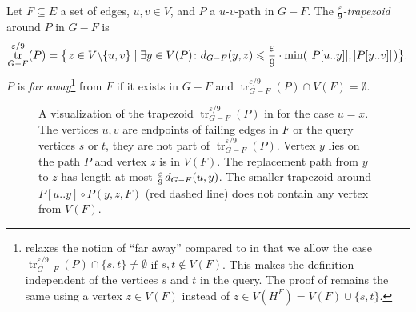 \documentclass{article}\usepackage[a4paper,margin=20mm]{geometry}
\DeclareMathOperator{\tr}{tr}
\newcommand*{\length}[1]{|#1|}
\newcommand*{\nwspace}{\hspace*{.1em}}
\renewcommand{\le}{\leqslant}
\newcommand{\eps}{\varepsilon}
\begin{document}
\begin{definition}[$\frac{\eps}{9}$-trapezoid]
\label{def:trapezoid}
  Let $F \subseteq E$ a set of edges, $u,v \in V$,
  and $P$ a $u$-$v$-path in $G-F$.
  The $\frac{\eps}{9}$\emph{-trapezoid} around $P$ in $G-F$ is
  \begin{equation*}
    \tr^{\eps/9}_{G-F}(P) = \big\lbrace\nwspace z \in V{\setminus}\{u,v\} \mid
      \exists y \in V(P) \colon d_{G-F}(y,z)
      \le \frac{\eps}{9}
        \cdot \min(\nwspace \length{P[u..y]}, \length{P[y..v]} \nwspace) \big\rbrace. 
  \end{equation*}
  \noindent
  $P$ is \emph{far away}\footnote{%
       relaxes the notion of ``far away'' compared to \cite{ChCoFiKa17}
      in that we allow the case
      $\tr^{\eps/9}_{G-F}(P) \cap \{s,t\} \neq \emptyset$
      if $s,t \notin V(F)$.
      This makes the definition independent of the vertices $s$ and $t$ in the query.
      The proof of  remains the same
      using a vertex $z \in V(F)$ instead of $z \in V(H^F) = V(F) \cup \{s,t\}$.
  }
  from $F$ if it exists in $G-F$
  and $\tr^{\eps/9}_{G-F}(P) \cap V(F) = \emptyset$.
\end{definition}


\begin{figure}
\centering
{}
\caption{ A visualization of the trapezoid $\tr^{\eps/9}_{G-F}(P)$ 
	in  for the case $u=x$.
	The vertices $u,v$ are endpoints of failing edges in $F$ or the query vertices $s$ or $t$,
	they are not part of $\tr^{\eps/9}_{G-F}(P)$.
	Vertex $y$ lies on the path $P$ and vertex $z$ is in $V(F)$.
	The replacement path from $y$ to $z$ has length 
	at most $\frac{\varepsilon}{9} \nwspace d_{G-F}(u,y)$.
	The smaller trapezoid around $P[u..y] \circ P(y,z,F)$ (red dashed line) 
	does not contain any vertex from $V(F)$.}
\label{fig:trapezoid}
\end{figure}
\end{document}
